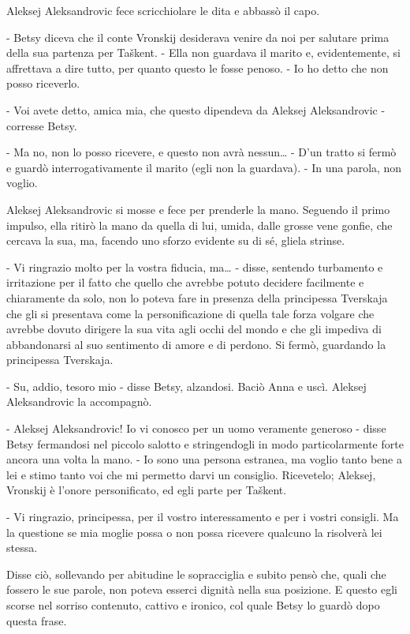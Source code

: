 Aleksej Aleksandrovic fece scricchiolare le dita e abbassò il capo. 

- Betsy diceva che il conte Vronskij desiderava venire da noi per salutare prima della sua partenza per Taškent. - Ella non guardava il marito e, evidentemente, si affrettava a dire tutto, per quanto questo le fosse penoso. - Io ho detto che non posso riceverlo. 

- Voi avete detto, amica mia, che questo dipendeva da Aleksej Aleksandrovic - corresse Betsy. 

- Ma no, non lo posso ricevere, e questo non avrà nessun\ldots{} - D'un tratto si fermò e guardò interrogativamente il marito (egli non la guardava). - In una parola, non voglio. 

Aleksej Aleksandrovic si mosse e fece per prenderle la mano. Seguendo il primo impulso, ella ritirò la mano da quella di lui, umida, dalle grosse vene gonfie, che cercava la sua, ma, facendo uno sforzo evidente su di sé, gliela strinse. 

- Vi ringrazio molto per la vostra fiducia, ma\ldots{} - disse, sentendo turbamento e irritazione per il fatto che quello che avrebbe potuto decidere facilmente e chiaramente da solo, non lo poteva fare in presenza della principessa Tverskaja che gli si presentava come la personificazione di quella tale forza volgare che avrebbe dovuto dirigere la sua vita agli occhi del mondo e che gli impediva di abbandonarsi al suo sentimento di amore e di perdono. Si fermò, guardando la principessa Tverskaja. 

- Su, addio, tesoro mio - disse Betsy, alzandosi. Baciò Anna e uscì. Aleksej Aleksandrovic la accompagnò. 

- Aleksej Aleksandrovic! Io vi conosco per un uomo veramente generoso - disse Betsy fermandosi nel piccolo salotto e stringendogli in modo particolarmente forte ancora una volta la mano. - Io sono una persona estranea, ma voglio tanto bene a lei e stimo tanto voi che mi permetto darvi un consiglio. Ricevetelo; Aleksej, Vronskij è l'onore personificato, ed egli parte per Taškent. 

- Vi ringrazio, principessa, per il vostro interessamento e per i vostri consigli. Ma la questione se mia moglie possa o non possa ricevere qualcuno la risolverà lei stessa. 

Disse ciò, sollevando per abitudine le sopracciglia e subito pensò che, quali che fossero le sue parole, non poteva esserci dignità nella sua posizione. E questo egli scorse nel sorriso contenuto, cattivo e ironico, col quale Betsy lo guardò dopo questa frase. 

